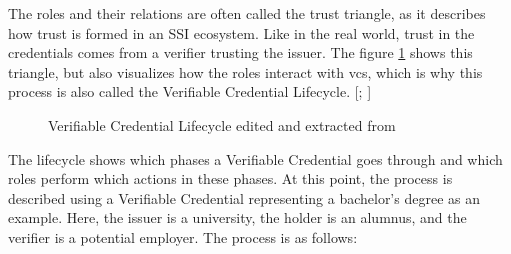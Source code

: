         The roles and their relations are often called the trust triangle, as it describes how trust is formed in an \ac{SSI} ecosystem. Like in the real world, trust in the credentials comes from a verifier trusting the issuer. The figure \ref{figure: vc lifecycle} shows this triangle, but also visualizes how the roles interact with \acp{vc}, which is why this process is also called the Verifiable Credential Lifecycle. [\citealp[pp. 25-26]{preukschat_self-sovereign_2021}; \citealp{sporny_verifiable_2019}]
        
        \begin{figure}[htp]
    	    \centering
    	    \makebox[\textwidth]{}
            \caption{Verifiable Credential Lifecycle edited and extracted from \cite{sporny_verifiable_2019}}
            \label{figure: vc lifecycle}
        \end{figure}
        
        The lifecycle shows which phases a Verifiable Credential goes through and which roles perform which actions in these phases. At this point, the process is described using a Verifiable Credential representing a bachelor's degree as an example. Here, the issuer is a university, the holder is an alumnus, and the verifier is a potential employer. The process is as follows:  \cite{sporny_verifiable_2019}
        
